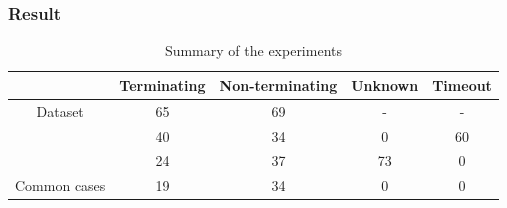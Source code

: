 \begin{frame}
\frametitle{Result}
\begin{table}[t]
	\label{tab:overview}
	\centering
	\begin{tabular}{c|cccc}
		 & Terminating & Non-terminating & Unknown & Timeout \\
		 \hline
		 Dataset & 65 & 69 & -& -\\
		\hline
		\svmranker & 40 & 34 & 0 & 60 \\
		\lassoranker & 24 & 37 & 73 & 0 \\
		\hline
		Common cases & 19 & 34 & 0 & 0
	\end{tabular}
	\caption{Summary of the experiments}
\end{table}
\end{frame}


